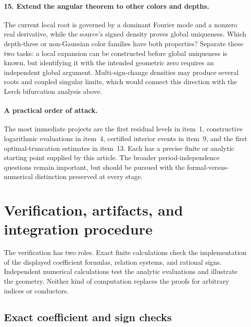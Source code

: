 \documentclass[11pt,a4paper]{article}
\theoremstyle{definition}
\theoremstyle{remark}
\numberwithin{equation}{section}
\begin{document}
\paragraph{15. Extend the angular theorem to other colors and depths.}
The current local root is governed by a dominant Fourier mode and
a nonzero real derivative, while the source's signed density proves
global uniqueness. Which depth-three or non-Gaussian color families
have both properties? Separate these two tasks: a local expansion can
be constructed before global uniqueness is known, but identifying it
with the intended geometric zero requires an independent global
argument. Multi-sign-change densities may produce several roots and
coupled singular limits, which would connect this direction with the
Lerch bifurcation analysis above.

\paragraph{A practical order of attack.}
The most immediate projects are the first residual levels in item~1,
constructive logarithmic evaluations in item~4, certified interior
events in item~9, and the first optimal-truncation estimates in item~13.
Each has a precise finite or analytic starting point supplied by this
article. The broader period-independence questions remain important,
but should be pursued with the formal-versus-numerical distinction
preserved at every stage.
\section{Verification, artifacts, and integration procedure}
\label{verify:sec:reproduction}

The verification has two roles. Exact finite calculations check the
implementation of the displayed coefficient formulas, relation systems,
and rational signs. Independent numerical calculations test the analytic
evaluations and illustrate the geometry. Neither kind of computation
replaces the proofs for arbitrary indices or conductors.

\subsection{Exact coefficient and sign checks}
\end{document}
